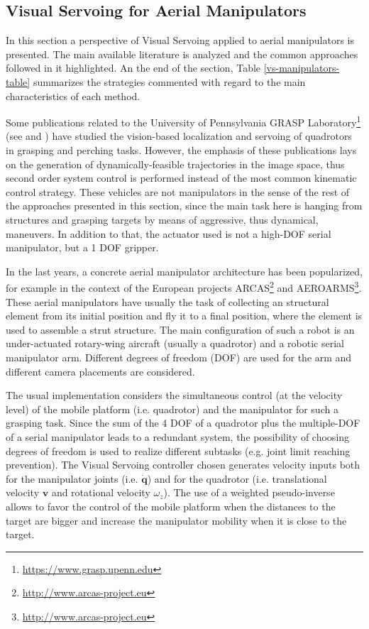    

\subsection{Visual Servoing for Aerial Manipulators}

In this section a perspective of Visual Servoing applied to aerial manipulators is presented. The main available literature is analyzed and the common approaches followed in it highlighted. An the end of the section, Table \ref{vs-manipulators-table} summarizes the strategies commented with regard to the main characteristics of each method. 


Some publications related to the University of Pennsylvania GRASP Laboratory\footnote{\url{https://www.grasp.upenn.edu}}  (see \cite{thomas_toward_2014} and \cite{thomas_visual_2016}) have studied the vision-based localization and servoing of quadrotors in grasping and perching tasks. However, the emphasis of these publications lays on the generation of dynamically-feasible trajectories in the image space, thus second order system control is performed instead of the most common kinematic control strategy. These vehicles are not manipulators in the sense of the rest of the approaches presented in this section, since the main task here is hanging from structures and grasping targets by means of aggressive, thus dynamical, maneuvers. In addition to that, the actuator used is not a high-DOF serial manipulator, but a 1 DOF gripper.  

In the last years, a concrete aerial manipulator architecture has been popularized, for example in the context of the European projects ARCAS\footnote{\url{http://www.arcas-project.eu}} and AEROARMS\footnote{\url{http://www.arcas-project.eu}}. These aerial manipulators have usually the task of collecting an structural element from its initial position and fly it to a final position, where the element is used to assemble a strut structure. The main configuration of such a robot is an under-actuated rotary-wing aircraft (usually a quadrotor) and a robotic serial manipulator arm. Different degrees of freedom (DOF) are used for the arm and different camera placements are considered.
 
 
 The usual implementation considers the simultaneous control (at the velocity level) of the mobile platform (i.e. quadrotor) and the manipulator for such a grasping task. Since the sum of the 4 DOF of a quadrotor plus the multiple-DOF of a serial manipulator leads to a redundant system, the possibility of choosing degrees of freedom is used to realize different subtasks (e.g. joint limit reaching prevention). The Visual Servoing controller chosen generates velocity inputs both for the manipulator joints (i.e. $\bm{\dot{q}}$) and for the quadrotor (i.e. translational velocity $\bm{v}$ and rotational velocity $\omega_z$). The use of a weighted pseudo-inverse allows to favor the control of the mobile platform when the distances to the target are bigger and increase the manipulator mobility when it is close to the target.
 
